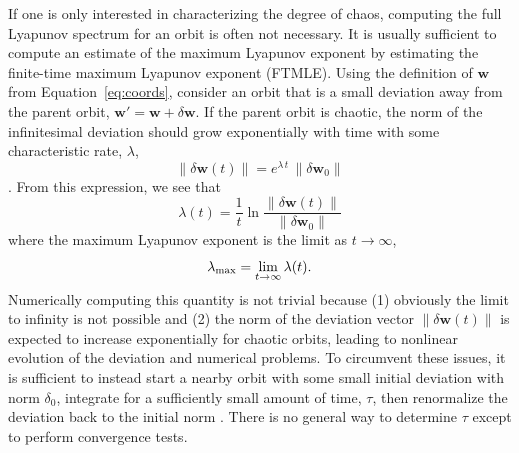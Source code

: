 \documentclass{mn2e}
\newcommand{\bs}[1]{\boldsymbol{#1}}
\begin{document}
If one is only interested in characterizing the degree of chaos, computing the full Lyapunov spectrum for an orbit is often not necessary. It is usually sufficient to compute an estimate of the maximum Lyapunov exponent by estimating the finite-time maximum Lyapunov exponent (FTMLE). Using the definition of $\boldsymbol{w}$ from Equation~\ref{eq:coords}, consider an orbit that is a small deviation away from the parent orbit, $\boldsymbol{w}' = \boldsymbol{w} + \delta\boldsymbol{w}$. If the parent orbit is chaotic, the norm of the infinitesimal deviation should grow exponentially with time with some characteristic rate, $\lambda$,
\begin{equation}
	\|\delta\boldsymbol{w}(t)\| = e^{\lambda \, t} \, \|\delta\boldsymbol{w}_0\|
\end{equation}
\citep[see, e.g.,][]{lichtenberg83,tabor89}. From this expression, we see that
\begin{equation}
	\lambda(t) = \frac{1}{t}\ln \frac{\|\delta \bs{w}(t)\|}{\|\delta \bs{w}_0\|} \label{eq:mle}
\end{equation}
where the maximum Lyapunov exponent is the limit as $t\rightarrow \infty$,
\begin{equation}
	\lambda_{\rm max} = \lim_{t\rightarrow\infty}\lambda(t). \label{eq:lmax}
\end{equation}
Numerically computing this quantity is not trivial because (1) obviously the limit to infinity is not possible and (2) the norm of the deviation vector $\|\delta \bs{w}(t)\|$ is expected to increase exponentially for chaotic orbits, leading to nonlinear evolution of the deviation and numerical problems. To circumvent these issues, it is sufficient to instead start a nearby orbit with some small initial deviation with norm $\delta_0$, integrate for a sufficiently small amount of time, $\tau$, then renormalize the deviation back to the initial norm \citep{benettin76}. There is no general way to determine $\tau$ except to perform convergence tests.
\end{document}
